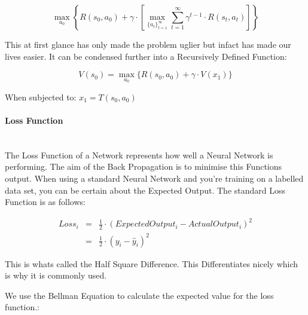 \begin{flushleft}
                    \[ \max_{a_{0}} \left\{ R(s_0, a_0) + \gamma \cdot \left[ \max_{\{a_{t}\}_{t=1}^{\infty}} \sum_{t=1}^{\infty} \gamma^{t-1} \cdot R(s_{t},a_{t})\right] \right\} \]
                    \vspace{0.2cm}

                    This at first glance has only made the problem uglier but infact has made our lives easier. It can be condensed further into a Recursively Defined Function:
                    \vspace{0.2cm}

                    \[ V(s_{0}) = \max_{a_{0}} \{ R(s_{0}, a_{0}) + \gamma \cdot V(x_{1}) \} \] 
                    \centerline{When subjected to: $ x_{1} = T(s_{0}, a_{0})$}
                    \vspace{0.2cm}

                \paragraph{Loss Function} \mbox{} \\
                    The Loss Function of a Network represents how well a Neural Network is performing. The aim of the Back Propagation is to minimise this Functions output. When using
                    a standard Neural Network and you're training on a labelled data set, you can be certain about the Expected Output. The standard Loss Function is as follows: \\ 
                    \vspace{0.2cm}
                    
                    \begin{eqnarray*}
                        Loss_{i} &=& \frac{1}{2} \cdot (Expected Output_{i} - Actual Output_{i})^{2} \\
                        &=& \frac{1}{2} \cdot (y_{i} - \hat{y}_{i})^{2}
                    \end{eqnarray*}
                    \vspace{0.2cm}

                    This is whats called the Half Square Difference. This Differentiates nicely which is why it is commonly used. \\
                    \vspace{0.2cm}

                    We use the Bellman Equation to calculate the expected value for the loss function.: \\
                    \vspace{0.2cm}


\end{flushleft}
